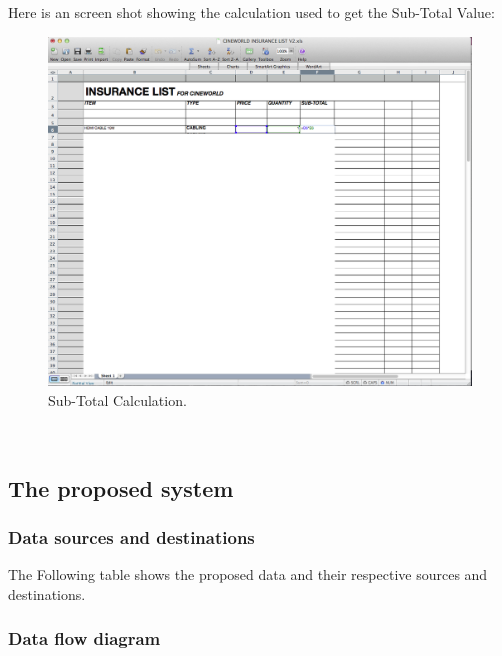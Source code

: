\newpage

\noindent Here is an screen shot showing the calculation used to get the Sub-Total Value:

\begin{figure}[H]
    \includegraphics[width=\textwidth]{./Analysis/Forms/sub_total_calc.png}
    \caption{Sub-Total Calculation.} \label{fig:print_function_result}
\end{figure}\\

\subsection{The proposed system}

\subsubsection{Data sources and destinations}

The Following table shows the proposed data and their respective sources and destinations.




\subsubsection{Data flow diagram}

